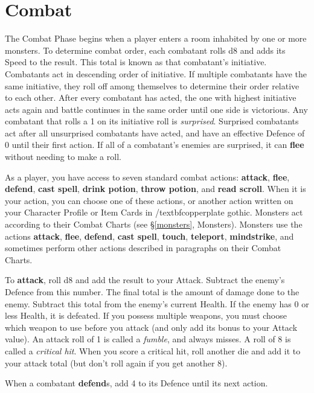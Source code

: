 \documentclass{book}
\begin{document}
\section{Combat} \label{combat}
The Combat Phase begins when a player enters a room inhabited by one or more monsters. To determine combat order, each combatant rolls d8 and adds its Speed to the result. This total is known as that combatant’s initiative. Combatants act in descending order of initiative. If multiple combatants have the same initiative, they roll off among themselves to determine their order relative to each other. After every combatant has acted, the one with highest initiative acts again and battle continues in the same order until one side is victorious.
Any combatant that rolls a 1 on its initiative roll is \emph{surprised}. Surprised combatants act after all unsurprised combatants have acted, and have an effective Defence of 0 until their first action. If all of a combatant’s enemies are surprised, it can \textbf{flee} without needing to make a roll.

As a player, you have access to seven standard combat actions: \textbf{attack}, \textbf{flee}, \textbf{defend}, \textbf{cast spell}, \textbf{drink potion}, \textbf{throw potion}, and \textbf{read scroll}. When it is your action, you can choose one of these actions, or another action written on your Character Profile or Item Cards in /textbf{copperplate gothic}.
Monsters act according to their Combat Charts (see §\ref{monsters}, Monsters). Monsters use the actions \textbf{attack}, \textbf{flee}, \textbf{defend}, \textbf{cast spell}, \textbf{touch}, \textbf{teleport}, \textbf{mindstrike}, and sometimes perform other actions described in paragraphs on their Combat Charts.

To \textbf{attack}, roll d8 and add the result to your Attack. Subtract the enemy’s Defence from this number. The final total is the amount of damage done to the enemy. Subtract this total from the enemy’s current Health. If the enemy has 0 or less Health, it is defeated. If you possess multiple weapons, you must choose which weapon to use before you attack (and only add its bonus to your Attack value).
An attack roll of 1 is called a \emph{fumble}, and always misses. A roll of 8 is called a \emph{critical hit}. When you score a critical hit, roll another die and add it to your attack total (but don’t roll again if you get another 8).

When a combatant \textbf{defend}s, add 4 to its Defence until its next action.
\end{document}
